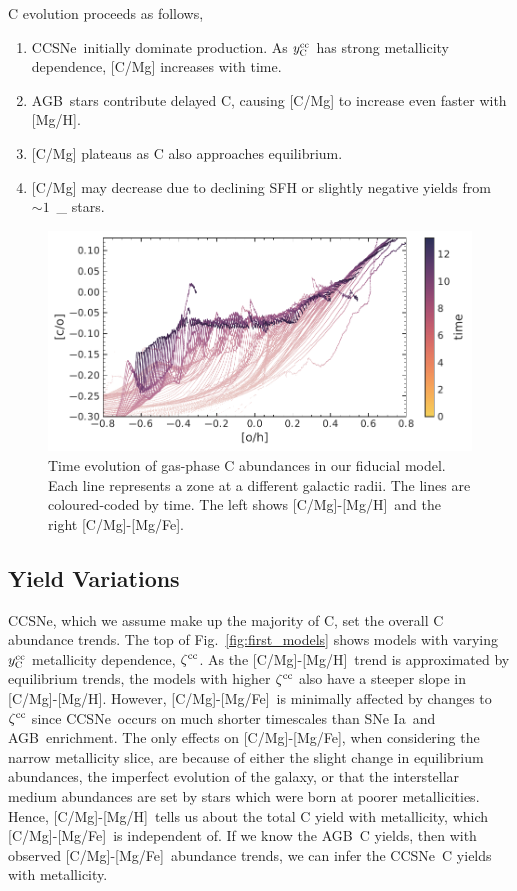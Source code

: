 \documentclass[fleqn,
usenatbib]{mnras}
\newcommand{\agb}{AGB}
\newcommand{\cc}{CCSNe}
\newcommand{\ia}{SNe Ia}
\newcommand{\caah}{[C/Mg]-[Mg/H]}
\newcommand{\caafe}{[C/Mg]-[Mg/Fe]}
\newcommand{\Ycc}{\ensuremath{y_{\rm C}^{\rm cc}}}
\newcommand{\Mo}{%
    \ifmmode {\rm M}_{\sun}%
    \else {M$_{\sun}$}%
    \fi}
\newcommand{\about}[1]{${\sim} #1$}
\begin{document}
C evolution proceeds as follows, 
\begin{enumerate}
    \item \cc\ initially dominate production. As $\Ycc$ has strong metallicity dependence, [C/Mg] increases with time. 
    \item \agb\ stars contribute delayed C, causing [C/Mg] to increase even faster with [Mg/H]. 
    \item{} [C/Mg] plateaus as C also approaches equilibrium. 
    \item{} [C/Mg] may decrease due to declining SFH or slightly negative yields from \about{1}\,\Mo stars.

\end{enumerate}


\begin{figure}
\centering
\includegraphics{all_the_tracks.pdf}
\caption[]{
    Time evolution of gas-phase C abundances in our fiducial model.
    Each line represents a zone at a different galactic radii. The lines are coloured-coded by time. The left shows \caah\ and the right \caafe. 
}
\label{fig:c_evo}
\end{figure}




\subsection{Yield Variations}\label{sec:results_highmass}
\label{sec:agb_results}

\cc, which we assume make up the majority of C, set the overall C abundance trends.
The top of Fig.~\ref{fig:first_models} shows models with varying $\Ycc$ metallicity dependence, $\zeta^{\rm cc}$. As the \caah~trend is approximated by equilibrium trends, the models with higher $\zeta^{\rm cc}$ also have a steeper slope in \caah. 
However, \caafe~is minimally affected by changes to $\zeta^{\rm cc}$ since \cc\ occurs on much shorter timescales than \ia\ and \agb\ enrichment. The only effects on \caafe, when considering the narrow metallicity slice, are because of either the slight change in equilibrium abundances, the imperfect evolution of the galaxy, or that the interstellar medium abundances are set by stars which were born at poorer metallicities. 
 Hence, \caah\ tells us about the total C yield with metallicity, which \caafe\ is independent of. If we know the \agb\ C yields, then with observed \caafe\ abundance trends, we can infer the \cc\ C yields with metallicity.
\end{document}
